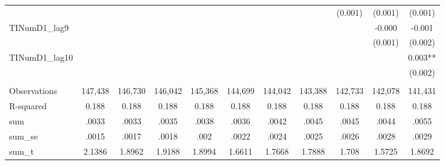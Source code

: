 \begin{tabular}{lcccccccccc}
 &  &  &  &  &  &  &  & (0.001) & (0.001) & (0.001) \\
TINumD1\_lag9 &  &  &  &  &  &  &  &  & -0.000 & -0.001 \\
 &  &  &  &  &  &  &  &  & (0.001) & (0.002) \\
TINumD1\_lag10 &  &  &  &  &  &  &  &  &  & 0.003** \\
 &  &  &  &  &  &  &  &  &  & (0.002) \\
 &  &  &  &  &  &  &  &  &  &  \\
Observations & 147,438 & 146,730 & 146,042 & 145,368 & 144,699 & 144,042 & 143,388 & 142,733 & 142,078 & 141,431 \\
R-squared & 0.188 & 0.188 & 0.188 & 0.188 & 0.188 & 0.188 & 0.188 & 0.188 & 0.188 & 0.188 \\
sum & .0033 & .0033 & .0035 & .0038 & .0036 & .0042 & .0045 & .0045 & .0044 & .0055 \\
sum\_se & .0015 & .0017 & .0018 & .002 & .0022 & .0024 & .0025 & .0026 & .0028 & .0029 \\
 sum\_t & 2.1386 & 1.8962 & 1.9188 & 1.8994 & 1.6611 & 1.7668 & 1.7888 & 1.708 & 1.5725 & 1.8692 \\ \hline
\end{tabular}
